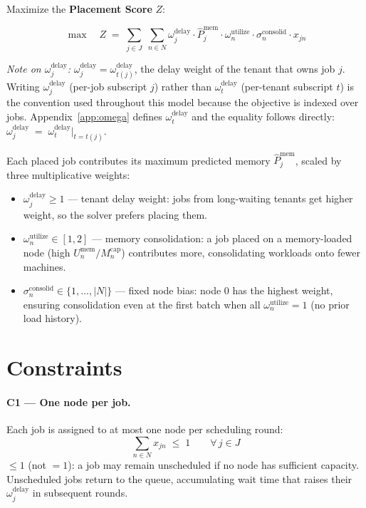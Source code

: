 \documentclass[11pt]{article}
\newcommand{\Mcap}{M_n^{\text{cap}}}
\newcommand{\sigconsolid}{\sigma_n^{\text{consolid}}}
\newcommand{\omutilize}{\omega_n^{\text{utilize}}}
\newcommand{\Umem}{U_n^{\text{mem}}}
\newcommand{\omdelay}{\omega_j^{\text{delay}}}
\newcommand{\omdelayt}{\omega_t^{\text{delay}}}
\newcommand{\Pmem}{\hat{P}_j^{\text{mem}}}
\begin{document}
Maximize the \textbf{Placement Score} $Z$:

\[
  \max \quad Z \;=\;
  \sum_{j \in J}\; \sum_{n \in N}
    \omdelay \cdot \Pmem \cdot \omutilize \cdot \sigconsolid \cdot x_{jn}
\]

\noindent\textit{Note on $\omdelay$:} $\omdelay = \omega_{t(j)}^{\text{delay}}$,
the delay weight of the tenant that owns job $j$. Writing $\omdelay$ (per-job
subscript $j$) rather than $\omdelayt$ (per-tenant subscript $t$) is the
convention used throughout this model because the objective is indexed over
jobs. Appendix~\ref{app:omega} defines $\omdelayt$ and the equality follows
directly: $\omdelay \;=\; \omdelayt\big|_{t=t(j)}$.

\medskip
Each placed job contributes its maximum predicted memory $\Pmem$, scaled by
three multiplicative weights:
\begin{itemize}[noitemsep, topsep=4pt]
  \item $\omdelay \geq 1$ --- tenant delay weight: jobs from long-waiting
    tenants get higher weight, so the solver prefers placing them.
  \item $\omutilize \in [1,2]$ --- memory consolidation: a job placed on a
    memory-loaded node (high $\Umem / \Mcap$) contributes more, consolidating
    workloads onto fewer machines.
  \item $\sigconsolid \in \{1,\ldots,|N|\}$ --- fixed node bias: node 0 has the
    highest weight, ensuring consolidation even at the first batch when all
    $\omutilize = 1$ (no prior load history).
\end{itemize}

\section{Constraints}

\paragraph{C1 --- One node per job.}
Each job is assigned to at most one node per scheduling round:
\[
  \sum_{n \in N} x_{jn} \;\leq\; 1 \qquad \forall\, j \in J
\]
$\leq 1$ (not $= 1$): a job may remain unscheduled if no node has sufficient
capacity. Unscheduled jobs return to the queue, accumulating wait time that
raises their $\omdelay$ in subsequent rounds.
\end{document}
